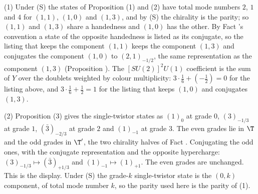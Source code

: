 (1) Under (S) the states of Proposition (1) and (2) have total mode numbers $2$, $1$ and $4$ for $(1,1)$, $(1,0)$ and $(1,3)$, and by (S) the chirality is the parity; so $(1,1)$ and $(1,3)$ share a handedness and $(1,0)$ has the other. By Fact 's convention a state of the opposite handedness is listed as its conjugate, so the listing that keeps the component $(1,1)$ keeps the component $(1,3)$ and conjugates the component $(1,0)$ to $(2,1)_{-1/2}$, the same representation as the component $(1,3)$ (Proposition ). The $[SU(2)]^{2}U(1)$ coefficient is the sum of $Y$ over the doublets weighted by colour multiplicity: $3 \cdot \tfrac16 + (-\tfrac12) = 0$ for the listing above, and $3 \cdot \tfrac16 + \tfrac12 = 1$ for the listing that keeps $(1,0)$ and conjugates $(1,3)$.

(2) Proposition (3) gives the single-twistor states as $(1)_{0}$ at grade $0$, $(3)_{-1/3}$ at grade $1$, $(\bar{3})_{-2/3}$ at grade $2$ and $(1)_{-1}$ at grade $3$. The even grades lie in $\T$ and the odd grades in $\T'$, the two chirality halves of Fact . Conjugating the odd ones, with the conjugate representation and the opposite hypercharge: $(3)_{-1/3} \mapsto (\bar{3})_{+1/3}$ and $(1)_{-1} \mapsto (1)_{+1}$. The even grades are unchanged. This is the display. Under (S) the grade-$k$ single-twistor state is the $(0, k)$ component, of total mode number $k$, so the parity used here is the parity of (1).

